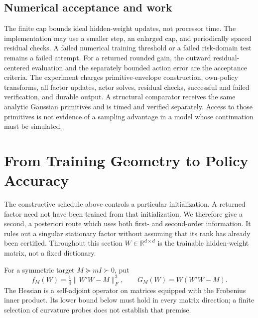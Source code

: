 \documentclass[ecta,nameyear,draft]{econsocart}
\theoremstyle{definition}
\theoremstyle{remark}
\newcommand{\R}{\mathbb R}
\begin{document}
\subsection{Numerical acceptance and work}
The finite cap bounds ideal hidden-weight updates, not processor time.
The implementation may use a smaller step, an enlarged cap, and periodically
spaced residual checks. A failed numerical training threshold or a failed
risk-domain test remains a failed attempt. For a returned rounded gain, the
outward residual-centered evaluation and the separately bounded action error
are the acceptance criteria. The experiment charges primitive-envelope
construction, own-policy transforms, all factor updates, actor solves,
residual checks, successful and failed verification, and durable output.
A structural comparator receives the same analytic Gaussian primitives and
is timed and verified separately. Access to those primitives is not evidence
of a sampling advantage in a model whose continuation must be simulated.

\section{From Training Geometry to Policy Accuracy}\label{sec:r32geometry}
The constructive schedule above controls a particular initialization. A returned
factor need not have been trained from that initialization. We therefore give
a second, a posteriori route which uses both first- and second-order information.
It rules out a singular stationary factor without assuming that its rank has
already been certified. Throughout this section $W\in\R^{d\times d}$ is the
trainable hidden-weight matrix, not a fixed dictionary.

For a symmetric target $M\succeq mI\succ0$, put
\[
 f_M(W)=\tfrac14\|W'W-M\|_F^2,\qquad G_M(W)=W(W'W-M).
\]
The Hessian is a self-adjoint operator on matrices equipped with the Frobenius
inner product. Its lower bound below must hold in every matrix direction;
a finite selection of curvature probes does not establish that premise.
\end{document}
